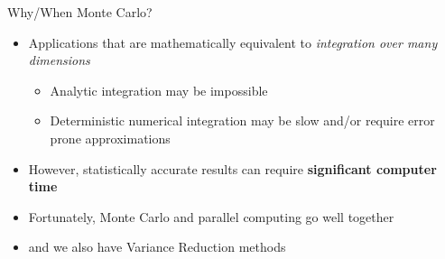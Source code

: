 \documentclass[xcolor=x11names,compress]{beamer}
\renewcommand{\(}{\begin{columns}}
\renewcommand{\)}{\end{columns}}
\newcommand{\<}[1]{\begin{column}{#1}}
\renewcommand{\>}{\end{column}}
\begin{document}
\begin{frame}{Why/When Monte Carlo?}

\begin{itemize}
\item Applications that are mathematically equivalent to \textit{integration over many dimensions}
\vspace*{0.25 em}
\begin{itemize}
\item Analytic integration may be impossible
\vspace*{0.25 em}
\item Deterministic numerical integration may be slow and/or require error prone approximations
\end{itemize} 
\vspace*{0.5 em}
\pause
\item However, statistically accurate results can require \textbf{significant computer time}
\item Fortunately, Monte Carlo and parallel computing go well together
\item and we also have Variance Reduction methods
\end{itemize}

\end{frame}
\end{document}
